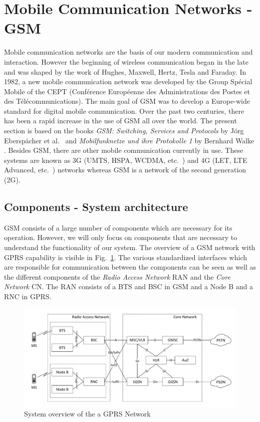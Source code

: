 \documentclass[master,english]{hgbthesis}
\begin{document}
\section{Mobile Communication Networks - GSM}
Mobile communication networks are the basis of our modern communication and interaction. However the beginning of wireless communication began in the late  and was shaped by the work of Hughes, Maxwell, Hertz, Tesla and Faraday. 
In 1982, a new mobile communication network was developed by the Group Spécial Mobile of the CEPT (Conférence Européenne des Administrations des Postes et des Télécommunications). The main goal of GSM was to develop a Europe-wide standard for digital mobile communication. Over the past two centuries, there has been a rapid increase in the use of GSM all over the world. The present section is based on the books \emph{GSM: Switching, Services and Protocols} by Jörg Eberspächer et al.\ \cite{Eberspaecher2001} and \emph{Mobilfunknetze und ihre Protokolle 1} by Bernhard Walke \cite{Walke2001}. 
Besides GSM, there are other mobile communication currently in use. These systems are known as 3G (UMTS, HSPA, WCDMA, etc.\ ) and 4G (LET, LTE Advanced, etc.\ ) networks whereas GSM is a network of the second generation (2G).
\subsection{Components - System architecture}
GSM consists of a large number of components which are necessary for its operation. However, we will only focus on components that are necessary to understand the functionality of our system. The overview of a GSM network with GPRS capability is visible in Fig.\ \ref{fig:GSMNetwork}.  The various standardized interfaces which are responsible for communication between the components can be seen as well as the different components of the \emph{Radio Access Network} RAN and the \emph{Core Network} CN. The RAN consists of a BTS and BSC in GSM and a Node B and a RNC in GPRS.
\begin{figure}
	\centering
	\includegraphics[width=\linewidth]{./images/GSMNetwork}
	\caption{System overview of the a GPRS Network}
	\label{fig:GSMNetwork}
\end{figure}
\end{document}
